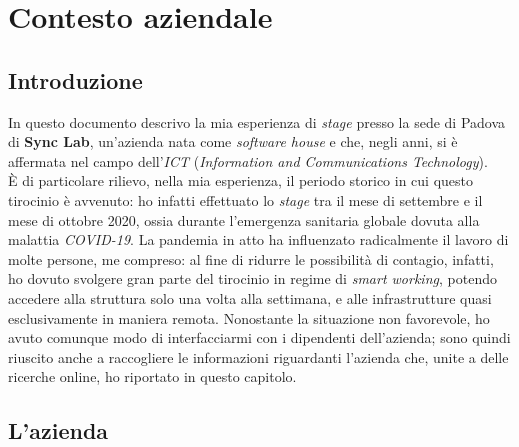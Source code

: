 
\chapter{Contesto aziendale}
\label{cap:contesto-aziendale}

%
%

\section{Introduzione}

In questo documento descrivo la mia esperienza di \textit{stage} presso la sede di Padova di \textbf{Sync Lab}, un'azienda nata come \textit{software house} e che, negli anni, si è affermata nel campo dell'\textit{ICT} (\textit{Information and Communications Technology}).\\
È di particolare rilievo, nella mia esperienza, il periodo storico in cui questo tirocinio è avvenuto: ho infatti effettuato lo \textit{stage} tra il mese di settembre e il mese di ottobre 2020, ossia durante l'emergenza sanitaria globale dovuta alla malattia \textit{COVID-19}. La pandemia in atto ha influenzato radicalmente il lavoro di molte persone, me compreso: al fine di ridurre le possibilità di contagio, infatti, ho dovuto svolgere gran parte del tirocinio in regime di \textit{smart working}, potendo accedere alla struttura solo una volta alla settimana, e alle infrastrutture quasi esclusivamente in maniera remota.
Nonostante la situazione non favorevole, ho avuto comunque modo di interfacciarmi con i dipendenti dell'azienda; sono quindi riuscito anche a raccogliere le informazioni riguardanti l'azienda che, unite a delle ricerche online, ho riportato in questo capitolo.

\section{L'azienda}

